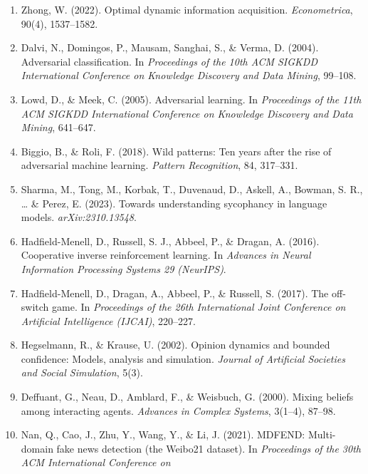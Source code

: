 \documentclass[
  11pt]{article}
\begin{document}
\begin{enumerate}
  Sehat, C. M., Johansen, S., Kerlin, L., Vickrey, D., Singh, S.,
  Vrijenhoek, S., Zhang, A., Andrus, M., Helberger, N., Proutskova, P.,
  Mitra, T., \& Vasan, N. (2024). Building human values into recommender
  systems: An interdisciplinary synthesis. \emph{ACM Transactions on
  Recommender Systems}, 2(3), Article 20, 57 pages.
  https://doi.org/10.1145/3632297
\item
  Zhong, W. (2022). Optimal dynamic information acquisition.
  \emph{Econometrica}, 90(4), 1537--1582.
\item
  Dalvi, N., Domingos, P., Mausam, Sanghai, S., \& Verma, D. (2004).
  Adversarial classification. In \emph{Proceedings of the 10th ACM
  SIGKDD International Conference on Knowledge Discovery and Data
  Mining}, 99--108.
\item
  Lowd, D., \& Meek, C. (2005). Adversarial learning. In
  \emph{Proceedings of the 11th ACM SIGKDD International Conference on
  Knowledge Discovery and Data Mining}, 641--647.
\item
  Biggio, B., \& Roli, F. (2018). Wild patterns: Ten years after the
  rise of adversarial machine learning. \emph{Pattern Recognition}, 84,
  317--331.
\item
  Sharma, M., Tong, M., Korbak, T., Duvenaud, D., Askell, A., Bowman, S.
  R., \ldots{} \& Perez, E. (2023). Towards understanding sycophancy in
  language models. \emph{arXiv:2310.13548}.
\item
  Hadfield-Menell, D., Russell, S. J., Abbeel, P., \& Dragan, A. (2016).
  Cooperative inverse reinforcement learning. In \emph{Advances in
  Neural Information Processing Systems 29 (NeurIPS)}.
\item
  Hadfield-Menell, D., Dragan, A., Abbeel, P., \& Russell, S. (2017).
  The off-switch game. In \emph{Proceedings of the 26th International
  Joint Conference on Artificial Intelligence (IJCAI)}, 220--227.
\item
  Hegselmann, R., \& Krause, U. (2002). Opinion dynamics and bounded
  confidence: Models, analysis and simulation. \emph{Journal of
  Artificial Societies and Social Simulation}, 5(3).
\item
  Deffuant, G., Neau, D., Amblard, F., \& Weisbuch, G. (2000). Mixing
  beliefs among interacting agents. \emph{Advances in Complex Systems},
  3(1--4), 87--98.
\item
  Nan, Q., Cao, J., Zhu, Y., Wang, Y., \& Li, J. (2021). MDFEND:
  Multi-domain fake news detection (the Weibo21 dataset). In
  \emph{Proceedings of the 30th ACM International Conference on
}
\end{enumerate}
\end{document}
